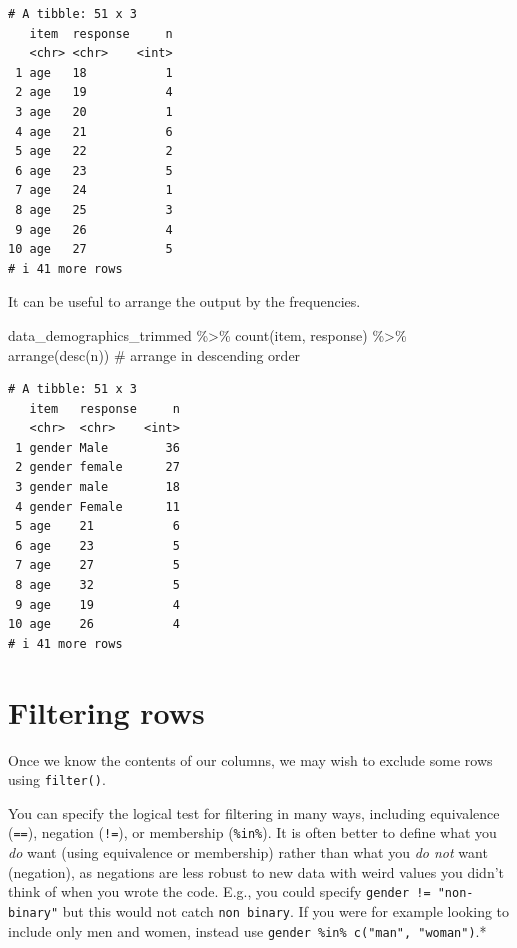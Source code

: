 \documentclass[
  letterpaper,
  DIV=11,
  numbers=noendperiod]{scrreprt}
\newenvironment{Shaded}{\begin{snugshade}}{\end{snugshade}}
\newcommand{\CommentTok}[1]{\textcolor[rgb]{0.37,0.37,0.37}{#1}}
\newcommand{\FunctionTok}[1]{\textcolor[rgb]{0.28,0.35,0.67}{#1}}
\newcommand{\NormalTok}[1]{\textcolor[rgb]{0.00,0.23,0.31}{#1}}
\newcommand{\SpecialCharTok}[1]{\textcolor[rgb]{0.37,0.37,0.37}{#1}}
\begin{document}
\begin{verbatim}
# A tibble: 51 x 3
   item  response     n
   <chr> <chr>    <int>
 1 age   18           1
 2 age   19           4
 3 age   20           1
 4 age   21           6
 5 age   22           2
 6 age   23           5
 7 age   24           1
 8 age   25           3
 9 age   26           4
10 age   27           5
# i 41 more rows
\end{verbatim}

It can be useful to arrange the output by the frequencies.

\begin{Shaded}
\begin{Highlighting}[]
\NormalTok{data\_demographics\_trimmed }\SpecialCharTok{\%\textgreater{}\%}
  \FunctionTok{count}\NormalTok{(item, response) }\SpecialCharTok{\%\textgreater{}\%}
  \FunctionTok{arrange}\NormalTok{(}\FunctionTok{desc}\NormalTok{(n)) }\CommentTok{\# arrange in descending order}
\end{Highlighting}
\end{Shaded}

\begin{verbatim}
# A tibble: 51 x 3
   item   response     n
   <chr>  <chr>    <int>
 1 gender Male        36
 2 gender female      27
 3 gender male        18
 4 gender Female      11
 5 age    21           6
 6 age    23           5
 7 age    27           5
 8 age    32           5
 9 age    19           4
10 age    26           4
# i 41 more rows
\end{verbatim}

\section{Filtering rows}\label{filtering-rows}

Once we know the contents of our columns, we may wish to exclude some
rows using \texttt{filter()}.

You can specify the logical test for filtering in many ways, including
equivalence (\texttt{==}), negation (\texttt{!=}), or membership
(\texttt{\%in\%}). It is often better to define what you \emph{do} want
(using equivalence or membership) rather than what you \emph{do not}
want (negation), as negations are less robust to new data with weird
values you didn't think of when you wrote the code. E.g., you could
specify \texttt{gender\ !=\ "non-binary"} but this would not catch
\texttt{non\ binary}. If you were for example looking to include only
men and women, instead use \texttt{gender\ \%in\%\ c("man",\ "woman")}.*
\end{document}
